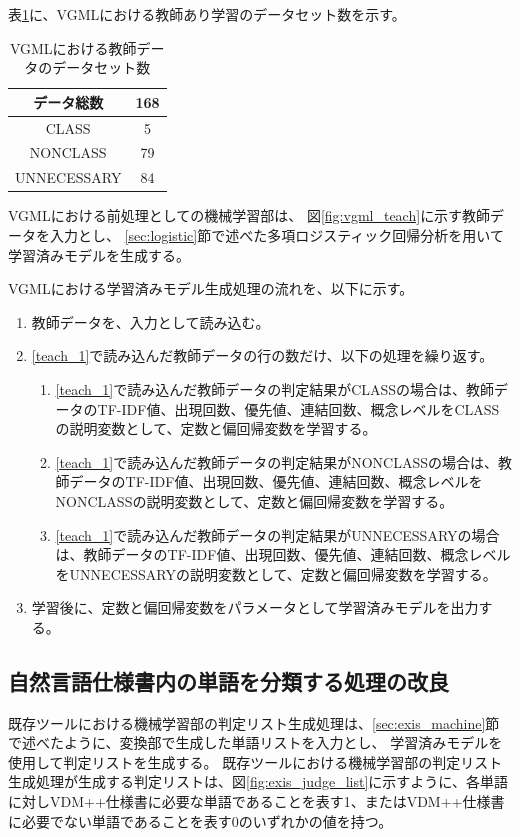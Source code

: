 表\ref{table:vgml_data_set}に、VGMLにおける教師あり学習のデータセット数を示す。

\begin{table}[t]
    \begin{center}
      \caption{VGMLにおける教師データのデータセット数}
      \label{table:vgml_data_set}
      \begin{tabular}{c|c}
        データ総数　& 168\\
        \hline
        \hline
        CLASS    & 5\\ \hline
        NONCLASS & 79\\ \hline
        UNNECESSARY   & 84\\ \hline
      \end{tabular}
    \end{center}
  \end{table}

VGMLにおける前処理としての機械学習部は、
図\ref{fig:vgml_teach}に示す教師データを入力とし、
\ref{sec:logistic}節で述べた多項ロジスティック回帰分析を用いて学習済みモデルを生成する。

VGMLにおける学習済みモデル生成処理の流れを、以下に示す。

\begin{enumerate}
	\item 教師データを、入力として読み込む。
    \label{teach_1}
	\item \ref{teach_1}で読み込んだ教師データの行の数だけ、以下の処理を繰り返す。
        \begin{enumerate}
            \item \ref{teach_1}で読み込んだ教師データの判定結果がCLASSの場合は、教師データのTF-IDF値、出現回数、優先値、連結回数、概念レベルをCLASSの説明変数として、定数と偏回帰変数を学習する。
            \item \ref{teach_1}で読み込んだ教師データの判定結果がNONCLASSの場合は、教師データのTF-IDF値、出現回数、優先値、連結回数、概念レベルをNONCLASSの説明変数として、定数と偏回帰変数を学習する。
            \item \ref{teach_1}で読み込んだ教師データの判定結果がUNNECESSARYの場合は、教師データのTF-IDF値、出現回数、優先値、連結回数、概念レベルをUNNECESSARYの説明変数として、定数と偏回帰変数を学習する。
        \end{enumerate}
	\item 学習後に、定数と偏回帰変数をパラメータとして学習済みモデルを出力する。
\end{enumerate}

\subsection{自然言語仕様書内の単語を分類する処理の改良}
既存ツールにおける機械学習部の判定リスト生成処理は、\ref{sec:exis_machine}節で述べたように、変換部で生成した単語リストを入力とし、
学習済みモデルを使用して判定リストを生成する。
既存ツールにおける機械学習部の判定リスト生成処理が生成する判定リストは、図\ref{fig:exis_judge_list}に示すように、各単語に対しVDM++仕様書に必要な単語であることを表す1、またはVDM++仕様書に必要でない単語であることを表す0のいずれかの値を持つ。

